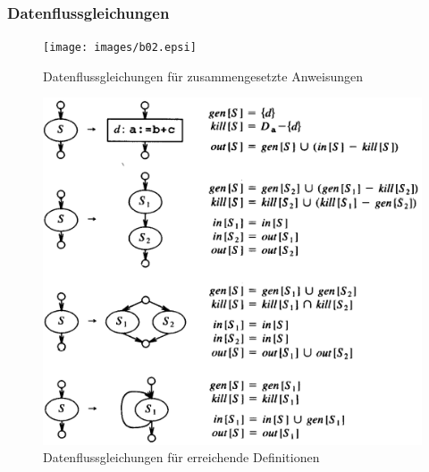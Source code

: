 \subsubsection{Datenflussgleichungen} %
\label{ssub:datenflussgleichungen}

\begin{figure}[!ht]
    \centering
    \texttt{[image: images/b02.epsi]}
    \caption{Datenflussgleichungen für zusammengesetzte Anweisungen}
\end{figure}

\begin{figure}[!ht]
    \centering
    \includegraphics[scale=0.2]{images/bild1-3.png}
    \caption{Datenflussgleichungen für \glqq erreichende Definitionen\grqq\ }
\end{figure}

\newpage
